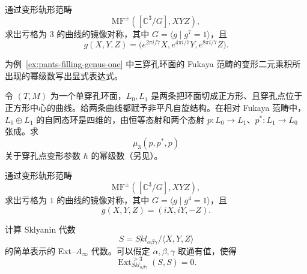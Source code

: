 \begin{exercise}
通过变形轨形范畴
\[
  \mathrm{MF}^{\pm}([\mathbb C^3/G],XYZ),
\]
求出亏格为 $3$ 的曲线的镜像对称，其中 $G=\langle g\mid g^7=1\rangle$，且
\[
  g(X,Y,Z)=\bigl(e^{2\pi i/7}X,e^{4\pi i/7}Y,e^{8\pi i/7}Z\bigr).
\]
\end{exercise}

\begin{exercise}
为例~\ref{ex:pants-filling-genus-one} 中三穿孔环面的 Fukaya 范畴的变形二元乘积所出现的幂级数写出显式表达式。
\end{exercise}

\begin{exercise}
令 $(T,M)$ 为一个单穿孔环面，$L_0,L_1$ 是两条把环面切成正方形、且穿孔点位于正方形中心的曲线。给两条曲线都赋予非平凡自旋结构。在相对 Fukaya 范畴中，$L_0\oplus L_1$ 的自同态环是四维的，由恒等态射和两个态射 $p:L_0\to L_1$、$p^*:L_1\to L_0$ 张成。求
\[
  \mu_3(p,p^*,p)
\]
关于穿孔点变形参数 $\hbar$ 的幂级数（另见）。
\end{exercise}

\begin{exercise}
通过变形轨形范畴
\[
  \mathrm{MF}^{\pm}([\mathbb C^3/G],XYZ),
\]
求出亏格为 $1$ 的曲线的镜像对称，其中 $G=\langle g\mid g^4=1\rangle$，且
\[
  g(X,Y,Z)=(iX,iY,-Z).
\]
\end{exercise}

\begin{exercise}
计算 Sklyanin 代数
\[
  S=Skl_{\alpha\beta\gamma}/\langle X,Y,Z\rangle
\]
的简单表示的 Ext--$A_\infty$ 代数。可以假定 $\alpha,\beta,\gamma$ 取通有值，使得
\[
  \operatorname{Ext}^{>3}_{Skl_{\alpha\beta\gamma}}(S,S)=0.
\]
\end{exercise}

